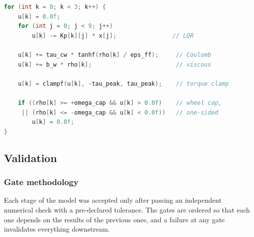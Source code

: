 \begin{lstlisting}[language=C,caption={Per-cycle actuation, applied after the
estimator of \S\ref{sec:estimation} and the control law of
\S\ref{sec:lqr}.}]
for (int k = 0; k < 3; k++) {
    u[k] = 0.0f;
    for (int j = 0; j < 9; j++)
        u[k] -= Kp[k][j] * x[j];                // LQR

    u[k] += tau_cw * tanhf(rho[k] / eps_ff);     // Coulomb
    u[k] += b_w * rho[k];                        // viscous

    u[k] = clampf(u[k], -tau_peak, tau_peak);    // torque clamp

    if ((rho[k] >= +omega_cap && u[k] > 0.0f)    // wheel cap,
     || (rho[k] <= -omega_cap && u[k] < 0.0f))   // one-sided
        u[k] = 0.0f;
}
\end{lstlisting}

\subsection{Validation}
\label{sec:validation}

\subsubsection{Gate methodology}
\label{sec:gates}

Each stage of the model was accepted only after passing an independent
numerical check with a pre-declared tolerance. The gates are ordered so that
each one depends on the results of the previous ones, and a failure at any
gate invalidates everything downstream.

